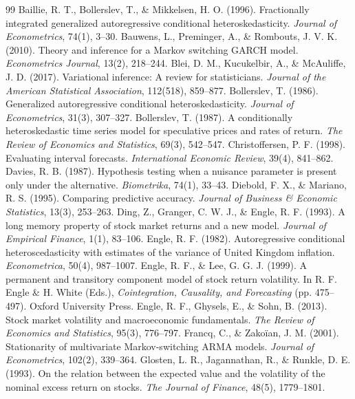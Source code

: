 \documentclass[12pt,a4paper]{article}
\numberwithin{equation}{section}
\theoremstyle{definition}
\begin{document}
\begin{thebibliography}{99}
 Baillie, R. T., Bollerslev, T., \& Mikkelsen, H. O. (1996). Fractionally integrated generalized autoregressive conditional heteroskedasticity. \emph{Journal of Econometrics}, 74(1), 3--30.
 Bauwens, L., Preminger, A., \& Rombouts, J. V. K. (2010). Theory and inference for a Markov switching GARCH model. \emph{Econometrics Journal}, 13(2), 218--244.
 Blei, D. M., Kucukelbir, A., \& McAuliffe, J. D. (2017). Variational inference: A review for statisticians. \emph{Journal of the American Statistical Association}, 112(518), 859--877.
 Bollerslev, T. (1986). Generalized autoregressive conditional heteroskedasticity. \emph{Journal of Econometrics}, 31(3), 307--327.
 Bollerslev, T. (1987). A conditionally heteroskedastic time series model for speculative prices and rates of return. \emph{The Review of Economics and Statistics}, 69(3), 542--547.
 Christoffersen, P. F. (1998). Evaluating interval forecasts. \emph{International Economic Review}, 39(4), 841--862.
 Davies, R. B. (1987). Hypothesis testing when a nuisance parameter is present only under the alternative. \emph{Biometrika}, 74(1), 33--43.
 Diebold, F. X., \& Mariano, R. S. (1995). Comparing predictive accuracy. \emph{Journal of Business \& Economic Statistics}, 13(3), 253--263.
 Ding, Z., Granger, C. W. J., \& Engle, R. F. (1993). A long memory property of stock market returns and a new model. \emph{Journal of Empirical Finance}, 1(1), 83--106.
 Engle, R. F. (1982). Autoregressive conditional heteroscedasticity with estimates of the variance of United Kingdom inflation. \emph{Econometrica}, 50(4), 987--1007.
 Engle, R. F., \& Lee, G. G. J. (1999). A permanent and transitory component model of stock return volatility. In R. F. Engle \& H. White (Eds.), \emph{Cointegration, Causality, and Forecasting} (pp. 475--497). Oxford University Press.
 Engle, R. F., Ghysels, E., \& Sohn, B. (2013). Stock market volatility and macroeconomic fundamentals. \emph{The Review of Economics and Statistics}, 95(3), 776--797.
 Francq, C., \& Zakoïan, J. M. (2001). Stationarity of multivariate Markov-switching ARMA models. \emph{Journal of Econometrics}, 102(2), 339--364.
 Glosten, L. R., Jagannathan, R., \& Runkle, D. E. (1993). On the relation between the expected value and the volatility of the nominal excess return on stocks. \emph{The Journal of Finance}, 48(5), 1779--1801.

\end{thebibliography}
\end{document}
